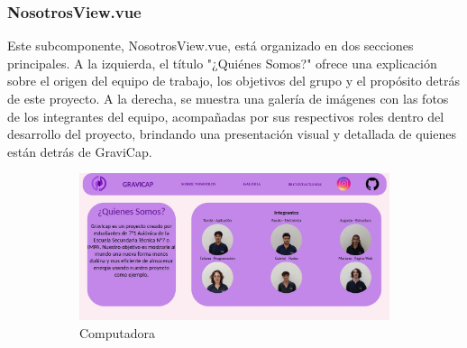                 \subsubsection{NosotrosView.vue}
                    Este subcomponente, NosotrosView.vue, está organizado en dos secciones principales. A la izquierda, el título "¿Quiénes Somos?" ofrece una explicación sobre el origen del equipo de trabajo, los objetivos del grupo y el propósito detrás de este proyecto. A la derecha, se muestra una galería de imágenes con las fotos de los integrantes del equipo, acompañadas por sus respectivos roles dentro del desarrollo del proyecto, brindando una presentación visual y detallada de quienes están detrás de \textcolor{dark_violet}{GraviCap}.\par

                    \begin{figure} [H]
                    \centering
                    \begin{subfigure}{0.5\textwidth}
                        \centering
                        \includegraphics[width=\textwidth]{Imagenes/Página Web/Computadora/Integrantes.jpg}
                        \caption{Computadora}
                        \label{fig:pw3.1}
                    \end{subfigure}
                    \hfill
                    \begin{subfigure}{0.4\textwidth}
                        \centering

\end{subfigure}
\end{figure}
